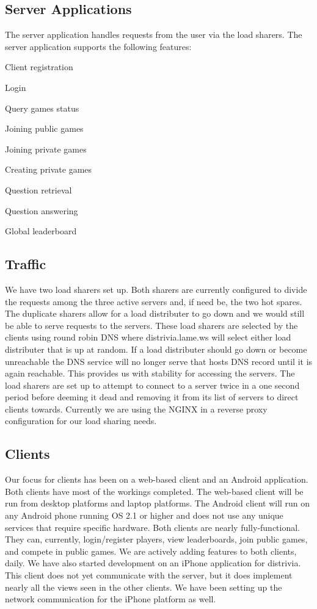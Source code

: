 \documentclass{dependencies/acm_proc_article-sp}
\begin{document}
\subsection{Server Applications}
The server application handles requests from the user via the load sharers.
The server application supports the following features:
\begin{itemized}
\item Client registration
\item Login
\item Query games status
\item Joining public games
\item Joining private games
\item Creating private games
\item Question retrieval
\item Question answering
\item Global leaderboard
\end{itemized}

\subsection{Traffic}
We have two load sharers set up. Both sharers are currently configured to
divide the requests among the three active servers and, if need be, the two hot spares. The duplicate sharers allow
for a load distributer to go down and we would still be able to serve requests
to the servers. These load sharers are selected by the clients using round
robin DNS where distrivia.lame.ws will select either load distributer that is
up at random. If a load distributer should go down or become unreachable the
DNS service will no longer serve that hosts DNS record until it is again
reachable. This provides us with stability for accessing the servers. The
load sharers are set up to attempt to connect to a server twice in a one second
period before deeming it dead and removing it from its list of servers to direct clients towards.
Currently we are using the NGINX \cite{nginx} in a reverse proxy configuration
for our load sharing needs.

\subsection{Clients}
Our focus for clients has been on a web-based client and an Android application.
Both clients have most of the workings completed. The web-based client will
be run from desktop platforms and laptop platforms. The Android client will run
on any Android phone running OS 2.1 or higher and does not use any unique services that require specific
hardware. Both clients are nearly fully-functional. They can, currently, login/register
players, view leaderboards, join public games, and compete in public games. We are actively adding features to both clients, daily.
We have also started development on an iPhone application for distrivia. This client does not yet communicate with the server, but 
it does implement nearly all the views seen in the other clients. We have been setting up the network communication for the iPhone
platform as well.
\end{document}
